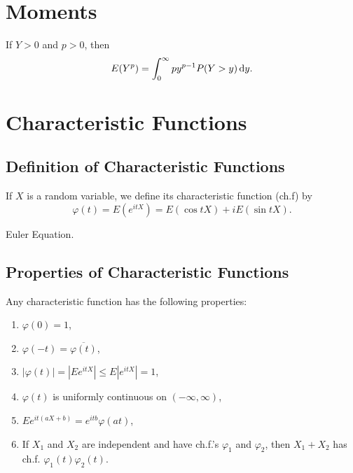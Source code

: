 \section{Moments}

\begin{lemma}
	If $Y>0$ and $p>0$, then
	\begin{equation}
		E(Y^p)=\int_{0}^{\infty}py^{p-1}P(Y>y)\mathop{}\!\mathrm{d} y.
	\end{equation}
\end{lemma}

\section{Characteristic Functions}

\subsection{Definition of Characteristic Functions}

\begin{definition} \label{def:characteristic-function}
	If $X$ is a random variable, we define its characteristic function (ch.f) by
	\begin{equation}
		\varphi(t)=E\left(e^{itX}\right)=E\left(\cos tX\right)+i E\left(\sin tX\right).
	\end{equation}
\end{definition}

\begin{remark}
	Euler Equation.
\end{remark}

\subsection{Properties of Characteristic Functions}

\begin{theorem} \label{thm:characteristic-function-property}
	Any characteristic function has the following properties:
	\begin{enumerate}
		\item $\varphi(0) = 1$,
		\item $\varphi(-t) = \overline{\varphi(t)}$,
		\item $|\varphi(t)| =|Ee^{itX}| \leq E|e^{itX}| = 1$,
		\item $\varphi(t)$ is uniformly continuous on $(-\infty,\infty)$,
		\item $Ee^{it(aX+b)}=e^{itb}\varphi(at)$,
		\item  If $X_1$ and $X_2$ are independent and have ch.f.'s $\varphi_1$ and $\varphi_2$, then $X_1+X_2$ has ch.f. $\varphi_1(t)\varphi_2(t)$.
	\end{enumerate}
\end{theorem}

